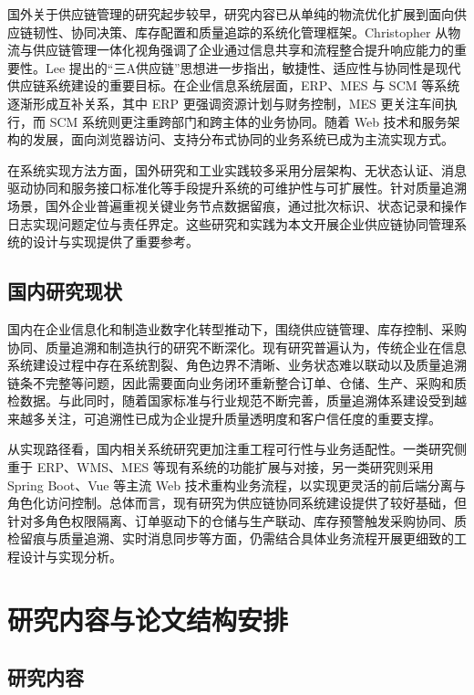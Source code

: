 国外关于供应链管理的研究起步较早，研究内容已从单纯的物流优化扩展到面向供应链韧性、协同决策、库存配置和质量追踪的系统化管理框架。Christopher 从物流与供应链管理一体化视角强调了企业通过信息共享和流程整合提升响应能力的重要性\citep{christopher2016}。Lee 提出的“三A供应链”思想进一步指出，敏捷性、适应性与协同性是现代供应链系统建设的重要目标\citep{lee2004triplea}。在企业信息系统层面，ERP、MES 与 SCM 等系统逐渐形成互补关系，其中 ERP 更强调资源计划与财务控制，MES 更关注车间执行，而 SCM 系统则更注重跨部门和跨主体的业务协同。随着 Web 技术和服务架构的发展，面向浏览器访问、支持分布式协同的业务系统已成为主流实现方式。

在系统实现方法方面，国外研究和工业实践较多采用分层架构、无状态认证、消息驱动协同和服务接口标准化等手段提升系统的可维护性与可扩展性。针对质量追溯场景，国外企业普遍重视关键业务节点数据留痕，通过批次标识、状态记录和操作日志实现问题定位与责任界定。这些研究和实践为本文开展企业供应链协同管理系统的设计与实现提供了重要参考。

\subsection{国内研究现状}

国内在企业信息化和制造业数字化转型推动下，围绕供应链管理、库存控制、采购协同、质量追溯和制造执行的研究不断深化。现有研究普遍认为，传统企业在信息系统建设过程中存在系统割裂、角色边界不清晰、业务状态难以联动以及质量追溯链条不完整等问题，因此需要面向业务闭环重新整合订单、仓储、生产、采购和质检数据。与此同时，随着国家标准与行业规范不断完善，质量追溯体系建设受到越来越多关注，可追溯性已成为企业提升质量透明度和客户信任度的重要支撑\citep{gbt22005-2009}。

从实现路径看，国内相关系统研究更加注重工程可行性与业务适配性。一类研究侧重于 ERP、WMS、MES 等现有系统的功能扩展与对接，另一类研究则采用 Spring Boot、Vue 等主流 Web 技术重构业务流程，以实现更灵活的前后端分离与角色化访问控制。总体而言，现有研究为供应链协同系统建设提供了较好基础，但针对多角色权限隔离、订单驱动下的仓储与生产联动、库存预警触发采购协同、质检留痕与质量追溯、实时消息同步等方面，仍需结合具体业务流程开展更细致的工程设计与实现分析。

\section{研究内容与论文结构安排}

\subsection{研究内容}


